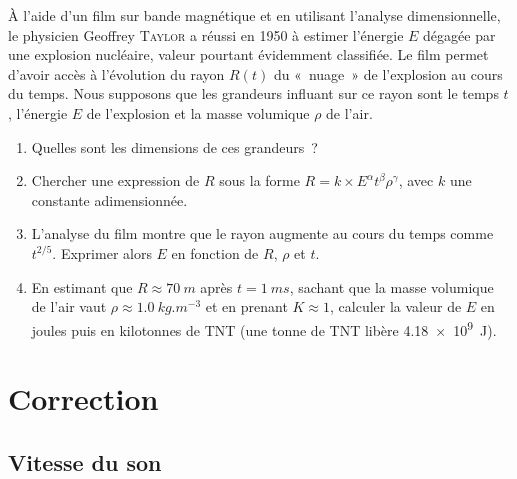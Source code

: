 \documentclass[../main/main.tex]{subfiles}
\begin{document}
À l'aide d'un film sur bande magnétique et en utilisant l'analyse
dimensionnelle, le physicien Geoffrey \textsc{Taylor} a réussi en 1950 à estimer
l'énergie $E$ dégagée par une explosion nucléaire, valeur pourtant évidemment
classifiée. Le film permet d'avoir accès à l'évolution du rayon $R(t)$ du
«~nuage~» de l'explosion au cours du temps. Nous supposons que les grandeurs
influant sur ce rayon sont le temps $t$, l'énergie $E$ de l'explosion et la
masse volumique $\rho$ de l'air.
\begin{enumerate}
	\item Quelles sont les dimensions de ces grandeurs~?
	\item Chercher une expression de $R$ sous la forme $R = k\times
		      E^{\alpha}t^\beta\rho^\gamma$, avec $k$ une constante adimensionnée.
	\item L'analyse du film montre que le rayon augmente au cours du temps comme
	      $t^{2/5}$. Exprimer alors $E$ en fonction de $R$, $\rho$ et $t$.
	\item En estimant que $R\approx \SI{70}{m}$ après $t = \SI{1}{ms}$, sachant
	      que la masse volumique de l'air vaut $\rho\approx \SI{1.0}{kg.m^{-3}}$
	      et en prenant $K\approx 1$, calculer la valeur de $E$ en joules puis en
	      kilotonnes de TNT (une tonne de TNT libère \SI{4.18e9}{J}).
\end{enumerate}

\newpage
\section{Correction}
\subsection{Vitesse du son}
\end{document}
